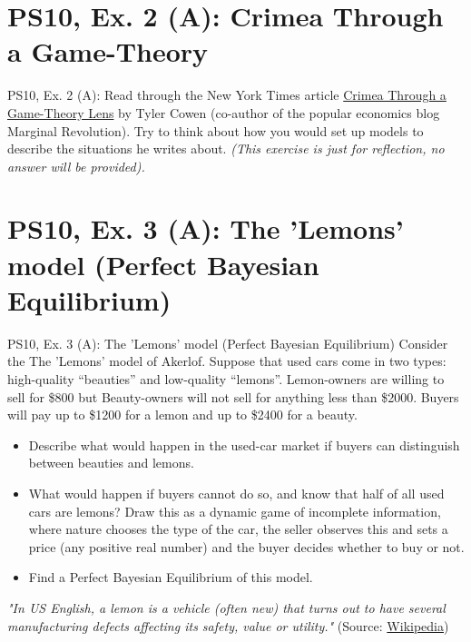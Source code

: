 \section{PS10, Ex. 2 (A): Crimea Through a Game-Theory }

\begin{frame}{PS10, Ex. 2 (A): }
    Read through the New York Times article \href{https://www.nytimes.com/2014/03/16/business/crimea-through-a-game-theory-lens.html}{Crimea Through a Game-Theory Lens} by Tyler Cowen (co-author of the popular economics blog Marginal Revolution). Try to think about how you would set up models to describe the situations he writes about. \textit{(This exercise is just for reflection, no answer will be provided).}
    \vfill\null
\end{frame}



\section{PS10, Ex. 3 (A): The 'Lemons' model (Perfect Bayesian Equilibrium)}

\begin{frame}{PS10, Ex. 3 (A): The 'Lemons' model (Perfect Bayesian Equilibrium)}
    Consider the The 'Lemons' model of Akerlof. Suppose that used cars come in two types: high-quality “beauties” and low-quality “lemons”. Lemon-owners are willing to sell for \$800 but Beauty-owners will not sell for anything less than \$2000. Buyers will pay up to \$1200 for a lemon and up to \$2400 for a beauty.
    \begin{itemize}
      \item[(a)] Describe what would happen in the used-car market if buyers can distinguish between beauties and lemons.
      \item[(b)] What would happen if buyers cannot do so, and know that half of all used cars are lemons? Draw this as a dynamic game of incomplete information, where nature chooses the type of the car, the seller observes this and sets a price (any positive real number) and the buyer decides whether to buy or not.
      \item[(c)] Find a Perfect Bayesian Equilibrium of this model.
    \end{itemize}
    \textit{"In US English, a lemon is a vehicle (often new) that turns out to have several manufacturing defects affecting its safety, value or utility."} (Source: \href{https://en.wikipedia.org/wiki/Lemon_(automobile)}{Wikipedia})
    \vfill\null
\end{frame}

